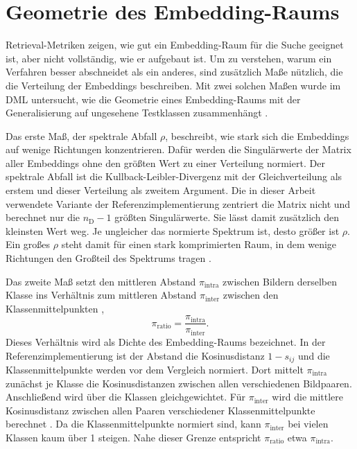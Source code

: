 \section{Geometrie des Embedding-Raums}
\label{sec:geometrie}

Retrieval-Metriken zeigen, wie gut ein Embedding-Raum für die Suche geeignet ist, aber nicht vollständig, wie er aufgebaut ist. Um zu verstehen, warum ein Verfahren besser abschneidet als ein anderes, sind zusätzlich Maße nützlich, die die Verteilung der Embeddings beschreiben. Mit zwei solchen Maßen wurde im \ac{DML} untersucht, wie die Geometrie eines Embedding-Raums mit der Generalisierung auf ungesehene Testklassen zusammenhängt \cite{roth_revisiting_2020}.

Das erste Maß, der spektrale Abfall $\rho$, beschreibt, wie stark sich die Embeddings auf wenige Richtungen konzentrieren. Dafür werden die Singulärwerte der Matrix aller Embeddings ohne den größten Wert zu einer Verteilung normiert. Der spektrale Abfall ist die Kullback-Leibler-Divergenz mit der Gleichverteilung als erstem und dieser Verteilung als zweitem Argument. Die in dieser Arbeit verwendete Variante der Referenzimplementierung zentriert die Matrix nicht und berechnet nur die $n_{\mathrm{D}}-1$ größten Singulärwerte. Sie lässt damit zusätzlich den kleinsten Wert weg. Je ungleicher das normierte Spektrum ist, desto größer ist $\rho$. Ein großes $\rho$ steht damit für einen stark komprimierten Raum, in dem wenige Richtungen den Großteil des Spektrums tragen \cite{roth_revisiting_2020}.

Das zweite Maß setzt den mittleren Abstand $\pi_{\mathrm{intra}}$ zwischen Bildern derselben Klasse ins Verhältnis zum mittleren Abstand $\pi_{\mathrm{inter}}$ zwischen den Klassenmittelpunkten \cite{roth_revisiting_2020},
\begin{equation}
  \pi_{\mathrm{ratio}}=\frac{\pi_{\mathrm{intra}}}{\pi_{\mathrm{inter}}}.
  \label{eq:piratio}
\end{equation}
Dieses Verhältnis wird als Dichte des Embedding-Raums bezeichnet. In der Referenzimplementierung ist der Abstand die Kosinusdistanz $1-s_{ij}$ und die Klassenmittelpunkte werden vor dem Vergleich normiert. Dort mittelt $\pi_{\mathrm{intra}}$ zunächst je Klasse die Kosinusdistanzen zwischen allen verschiedenen Bildpaaren. Anschließend wird über die Klassen gleichgewichtet. Für $\pi_{\mathrm{inter}}$ wird die mittlere Kosinusdistanz zwischen allen Paaren verschiedener Klassenmittelpunkte berechnet \cite{roth_revisiting_2020}. Da die Klassenmittelpunkte normiert sind, kann $\pi_{\mathrm{inter}}$ bei vielen Klassen kaum über 1 steigen. Nahe dieser Grenze entspricht $\pi_{\mathrm{ratio}}$ etwa $\pi_{\mathrm{intra}}$.

